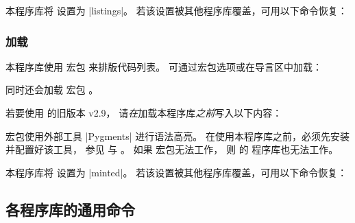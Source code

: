 本程序库将  设置为 |listings|。
若该设置被其他程序库覆盖，可用以下命令恢复：
\begin{dispListing}
\end{dispListing}


\clearpage
\subsubsection{加载 }
本程序库使用  宏包 \cite{poore:minted} 来排版代码列表。
可通过宏包选项或在导言区中加载：
\begin{dispListing}
\end{dispListing}
同时还会加载  宏包 \cite{poore:minted}。

\begin{marker}
若要使用  的旧版本 v2.9，
请\emph{在}加载本程序库\emph{之前}写入以下内容：
\begin{dispListing}
\usepackage{minted2}
\end{dispListing}
\end{marker}

\begin{marker}
 宏包使用外部工具 |Pygments| \cite{pygments:web} 进行语法高亮。
在使用本程序库之前，必须先安装并配置好该工具，
参见 \cite{poore:minted} 与 \cite{pygments:web}。
如果  \cite{poore:minted} 宏包无法工作，
则  的  程序库也无法工作。
\end{marker}

本程序库将  设置为 |minted|。
若该设置被其他程序库覆盖，可用以下命令恢复：
\begin{dispListing}
\end{dispListing}


\subsection{各程序库的通用命令}

